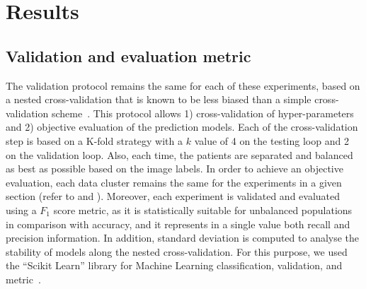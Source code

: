 \documentclass[journal,article,accept,moreauthors,pdftex, applsci]{Definitions/mdpi}
\newcommand{\fscore}{$F_{1}$ score}
\begin{document}
\section{Results}
\label{sec:results}

\subsection{Validation and evaluation metric}
The validation protocol remains the same for each of these experiments, based on a nested cross-validation that is known to be less biased than a simple cross-validation scheme~\cite{Cawley2010}. This protocol allows 1) cross-validation of hyper-parameters and 2) objective evaluation of the prediction models. Each of the cross-validation step is based on a K-fold strategy with a $k$ value of 4 on the testing loop and 2 on the validation loop. Also, each time, the patients are separated and balanced as best as possible based on the image labels. In order to achieve an objective evaluation, each data cluster remains the same for the experiments in a given section (refer to  and ). Moreover, each experiment is validated and evaluated using a \fscore{} metric, as it is statistically suitable for unbalanced populations in comparison with accuracy, and it represents in a single value both recall and precision information. In addition, standard deviation is computed to analyse the stability of models along the nested cross-validation. For this purpose, we used the “Scikit Learn” library for Machine Learning classification, validation, and metric~\cite{pedregosa2011scikit}.\par
\end{document}
